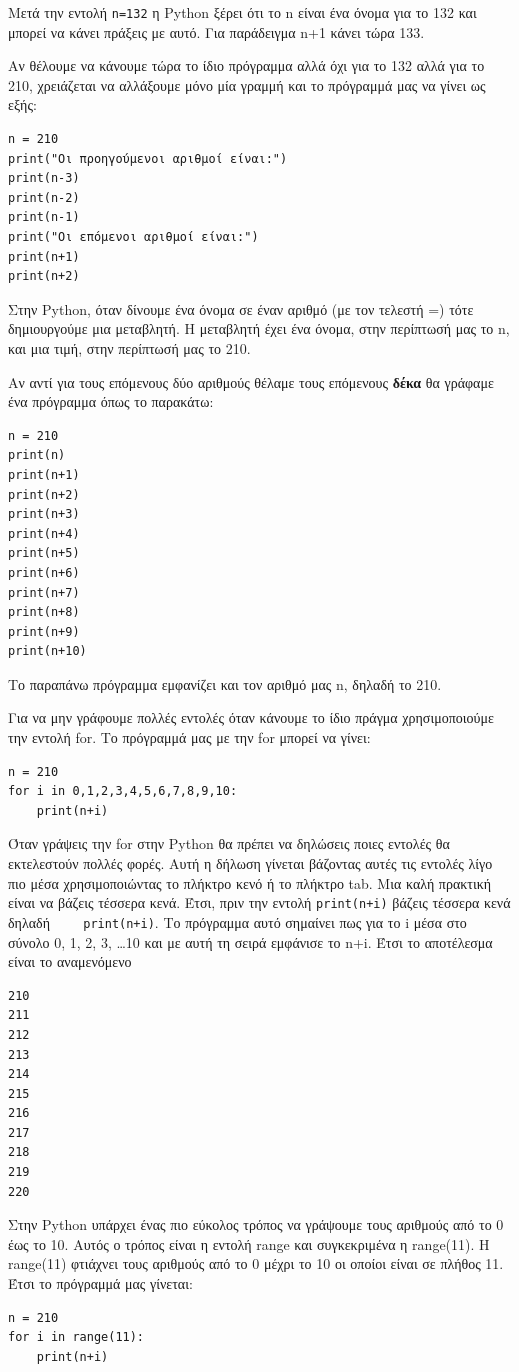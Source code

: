 Μετά την εντολή \lstinline{n=132} η Python ξέρει ότι το n είναι ένα όνομα για το 132 και μπορεί να κάνει πράξεις με αυτό. Για παράδειγμα n+1 κάνει τώρα 133.

Αν θέλουμε να κάνουμε τώρα το ίδιο πρόγραμμα αλλά όχι για το 132 αλλά για το 210, χρειάζεται να αλλάξουμε μόνο μία γραμμή και το πρόγραμμά μας να γίνει ως εξής:
\begin{lstlisting}
n = 210
print("Οι προηγούμενοι αριθμοί είναι:")
print(n-3)
print(n-2)
print(n-1)
print("Οι επόμενοι αριθμοί είναι:")
print(n+1)
print(n+2)
\end{lstlisting}

Στην Python, όταν δίνουμε ένα όνομα σε έναν αριθμό (με τον τελεστή =) τότε δημιουργούμε μια μεταβλητή. Η μεταβλητή έχει ένα όνομα, στην περίπτωσή μας το n, και μια τιμή, στην περίπτωσή μας το 210.

Αν αντί για τους επόμενους δύο αριθμούς θέλαμε τους επόμενους \textbf{δέκα} θα γράφαμε ένα πρόγραμμα όπως το παρακάτω:
\begin{lstlisting}
n = 210
print(n)
print(n+1)
print(n+2)
print(n+3)
print(n+4)
print(n+5)
print(n+6)
print(n+7)
print(n+8)
print(n+9)
print(n+10)
\end{lstlisting}
Το παραπάνω πρόγραμμα εμφανίζει και τον αριθμό μας n, δηλαδή το 210.

Για να μην γράφουμε πολλές εντολές όταν κάνουμε το ίδιο πράγμα χρησιμοποιούμε την εντολή for.
Το πρόγραμμά μας με την for μπορεί να γίνει:
\begin{lstlisting}
n = 210
for i in 0,1,2,3,4,5,6,7,8,9,10:
    print(n+i)
\end{lstlisting}
Όταν γράψεις την for στην Python θα πρέπει να δηλώσεις ποιες εντολές θα εκτελεστούν πολλές φορές. Αυτή η δήλωση γίνεται βάζοντας αυτές τις εντολές λίγο πιο μέσα χρησιμοποιώντας το πλήκτρο κενό ή το πλήκτρο tab. Μια καλή πρακτική είναι να βάζεις τέσσερα κενά. Έτσι, πριν την εντολή \lstinline{print(n+i)} βάζεις τέσσερα κενά δηλαδή \lstinline[showspaces=true]{    print(n+i)}.
Το πρόγραμμα αυτό σημαίνει πως για το i μέσα στο σύνολο 0, 1, 2, 3, \ldots 10 και με αυτή τη σειρά εμφάνισε το n+i. Έτσι το αποτέλεσμα είναι το αναμενόμενο
\begin{lstlisting}
210
211
212
213
214
215
216
217
218
219
220
\end{lstlisting}

Στην Python υπάρχει ένας πιο εύκολος τρόπος να γράψουμε τους αριθμούς από το 0 έως το 10. Αυτός ο τρόπος είναι η εντολή range και συγκεκριμένα η range(11). Η range(11) φτιάχνει τους αριθμούς από το 0 μέχρι το 10 οι οποίοι είναι σε πλήθος 11. 
Έτσι το πρόγραμμά μας γίνεται:
\begin{lstlisting}
n = 210
for i in range(11):
    print(n+i)
\end{lstlisting}

